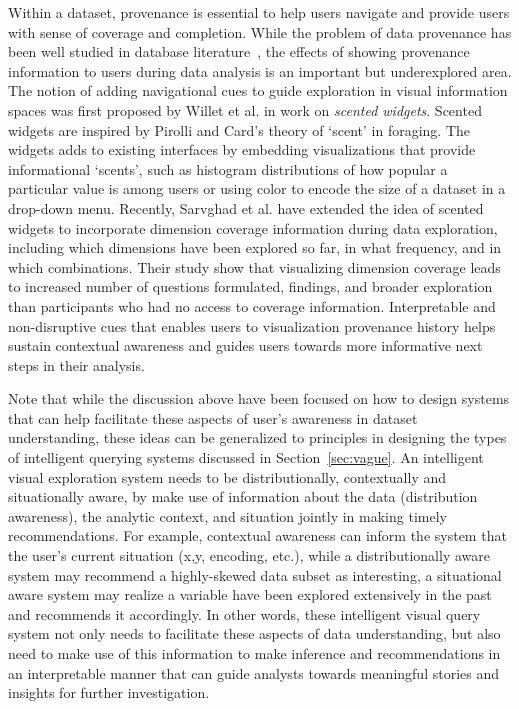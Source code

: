 \par Within a dataset, provenance is essential to help users navigate and provide users with sense of coverage and completion. While the problem of data provenance has been well studied in database literature~\cite{Buneman2006,Cui2003,Woodruff1997}, the effects of showing provenance information to users during data analysis is an important but underexplored area. The notion of adding navigational cues to guide exploration in visual information spaces was first proposed by Willet et al.\cite{Willett2007} in work on \textit{scented widgets}. Scented widgets are inspired by Pirolli and Card's theory of `scent' in foraging. The widgets adds to existing interfaces by embedding visualizations that provide informational `scents', such as histogram distributions of how popular a particular value is among users or using color to encode the size of a dataset in a drop-down menu. Recently, Sarvghad et al. \cite{Sarvghad2017} have extended the idea of scented widgets to incorporate dimension coverage information during data exploration, including which dimensions have been explored so far, in what frequency, and in which combinations. Their study show that visualizing dimension coverage leads to increased number of questions formulated, findings, and broader exploration than participants who had no access to coverage information. Interpretable and non-disruptive cues that enables users to visualization provenance history helps sustain contextual awareness and guides users towards more informative next steps in their analysis.

\par Note that while the discussion above have been focused on how to design systems that can help facilitate these aspects of user's awareness in dataset understanding, these ideas can be generalized to principles in designing the types of intelligent querying systems discussed in Section~\ref{sec:vague}. An intelligent visual exploration system needs to be distributionally, contextually and situationally aware, by make use of information about the data (distribution awareness), the analytic context, and situation jointly in making timely recommendations. For example, contextual awareness can inform the system that the user's current situation (x,y, encoding, etc.), while a distributionally aware system may recommend a highly-skewed data subset as interesting, a situational aware system may realize a variable have been explored extensively in the past and recommends it accordingly. In other words, these intelligent visual query system not only needs to facilitate these aspects of data understanding, but also need to make use of this information to make inference and recommendations in an interpretable manner that can guide analysts towards meaningful stories and insights for further investigation.

